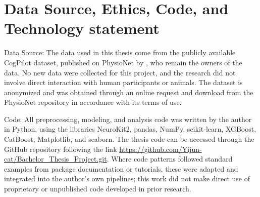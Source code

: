 \documentclass[11pt, a4paper]{article}
\begin{document}


\begin{abstract}
This study investigates the predictive accuracy of task performance during virtual reality landing tasks in near real time from multimodal physiological and simulator‑derived features using tree‑based machine learning models. The objective is to assess whether such models can support automated, continuous monitoring in pilot training scenarios. Analyses are based on the publicly available CogPilot dataset, which contains synchronized physiological signals and aircraft behavior data from participants following an instrument landing system procedure in an immersive VR flight simulator. ECG and respiration signals were preprocessed to derive heart‑rate and breathing features within sliding 10‑second windows and combined with aircraft control variables to form second‑by‑second observations. Random Forest, XGBoost, and CatBoost multi‑output regressors were trained to predict performance errors and were evaluated under subject‑level and temporal generalization settings, with and without one‑ and two‑step lagged performance features. Models with lagged features achieved high predictive accuracy compared with models using only non‑lagged features. The best CatBoost configurations attained mean coefficients of determination close to 0.98 across settings and preserved the correlation structure between component and total errors. Feature‑importance analyses showed that very recent aircraft control and performance history dominated predictions, while physiological features provided modest additional value.
\end{abstract}

\section{Data Source, Ethics, Code, and Technology statement}
Data Source:
The data used in this thesis come from the publicly available CogPilot dataset, published on PhysioNet \cite{goldberger-2000} by \cite{rao-2022}, who remain the owners of the data. No new data were collected for this project, and the research did not involve direct interaction with human participants or animals. The dataset is anonymized and was obtained through an online request and download from the PhysioNet repository in accordance with its terms of use.

Code:
All preprocessing, modeling, and analysis code was written by the author in Python, using the libraries NeuroKit2, pandas, NumPy, scikit‑learn, XGBoost, CatBoost, Matplotlib, and seaborn. The thesis code can be accessed through the GitHub repository following the link \href{https://github.com/Yijun-cat/Bachelor_Thesis_Project.git}{https://github.com/Yijun-cat/Bachelor\_Thesis\_Project.git}. Where code patterns followed standard examples from package documentation or tutorials, these were adapted and integrated into the author’s own pipelines; this work did not make direct use of proprietary or unpublished code developed in prior research.
\end{document}
